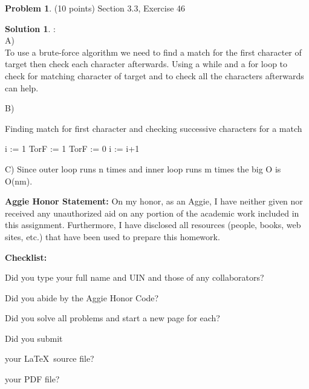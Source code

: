 \documentclass{article}
\theoremstyle{definition}
\newtheorem{problem}{Problem}
\newtheorem*{solution}{Solution}
\newcommand{\honor}{\noindent \textbf{Aggie Honor Statement: }On my honor, as an Aggie, I have neither
  given nor received any unauthorized aid on any portion of the
  academic work included in this assignment. Furthermore, I have
  disclosed all resources (people, books, web sites, etc.) that have
  been used to prepare this homework. 
}
\newcommand{\checklist}{\noindent\textbf{Checklist:}
\begin{compactenum}
\item Did you type your full name and UIN and those of any collaborators? 
\item Did you abide by the Aggie Honor Code?
\item Did you solve all problems and start a new page for each? 
\item Did you submit
\begin{compactenum}
\item your \LaTeX\ source file?
\item your  PDF file?
\end{compactenum}
\end{compactenum}
}
\begin{document}
\begin{problem} (10 points) Section 3.3, Exercise 46
\end{problem}
\begin{solution}:
\\
A)
\\
To use a brute-force algorithm we need to find a match for the first character of target then check each character afterwards. Using a while and a for loop to check for matching character of target and to check all the characters afterwards can help.
\\
\bigskip

B)
\\
\begin{algorithm}
\caption{Finding match for first character and checking successive characters for a match}
\label{}
\begin{algorithmic}[1]
    \State i := 1
    TorF := 1
    TorF := 0
    \EndIf
    \EndFor
    i := i+1
    \EndWhile
\EndProcedure
\end{algorithmic}
\end{algorithm}
\bigskip

C) Since outer loop runs n times and inner loop runs m times the big O is O(nm).
\end{solution}


\goodbreak


\goodbreak
\bigskip
\bigskip
\bigskip
\bigskip
\honor

\bigskip
\checklist
\end{document}
